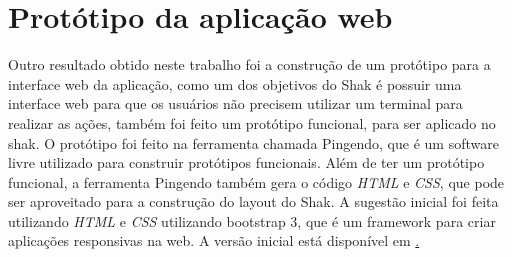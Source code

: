 \section{Protótipo da aplicação web}
\label{sub:prototipo}

Outro resultado obtido neste trabalho foi a construção de um protótipo para a interface
web da aplicação, como um dos objetivos do Shak é possuir uma interface web para que
os usuários não precisem utilizar um terminal para realizar as ações, também foi
feito um protótipo funcional, para ser aplicado no shak. O protótipo foi feito
na ferramenta chamada Pingendo, que é um software livre utilizado para construir
protótipos funcionais. Além de ter um protótipo funcional, a ferramenta Pingendo
também gera o código \textit{HTML} e \textit{CSS}, que pode ser aproveitado para a construção
do layout do Shak. A sugestão inicial foi feita utilizando \textit{HTML} e \textit{CSS} utilizando
bootstrap 3, que é um framework para criar aplicações responsivas na web. A versão
inicial está disponível em \href{https://gitlab.com/Thiagovsk/shak_frontend/tree/master}.


